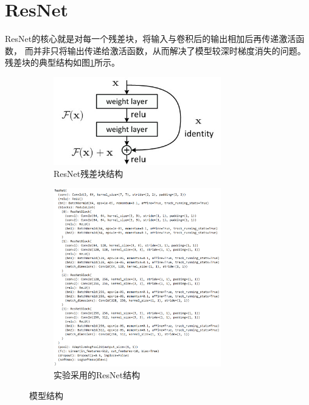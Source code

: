 \section{ResNet}
ResNet的核心就是对每一个残差块，将输入与卷积后的输出相加后再传递激活函数，
而并非只将输出传递给激活函数，从而解决了模型较深时梯度消失的问题。
残差块的典型结构如图\ref{fig:ResNetArchitecture}所示。

\begin{figure}[H]
    \begin{subfigure}[c]{0.45\textwidth}
        \centering
        \includegraphics[width=0.8\textwidth]{./figures/ResNetArchitecture.jpg}
        \caption{ResNet残差块结构}
        \label{fig:ResNetArchitecture}
    \end{subfigure}
    \hfill
    \begin{subfigure}[c]{0.45\textwidth}
        \centering
        \includegraphics[width=0.8\textwidth]{./figures/MyResNet.png}
        \caption{实验采用的ResNet结构}
        \label{fig:MyResNet}
    \end{subfigure}
    \caption{模型结构}
    \label{fig:Architectures}
\end{figure}

